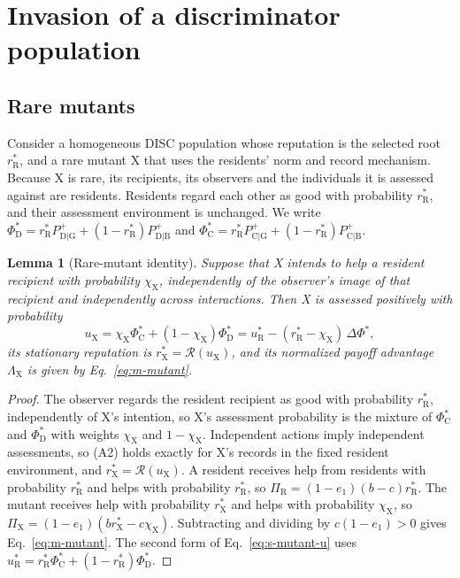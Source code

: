 \documentclass[fleqn,10pt]{wlscirep}
\newcommand{\Rmap}{\mathscr{R}}            %
\newcommand{\Pp}[1]{P^{+}_{\mathrm{#1}}}   %
\newcommand{\rR}{r_{\mathrm{R}}^{*}}
\newcommand{\uR}{u_{\mathrm{R}}^{*}}
\newcommand{\rX}{r_{\mathrm{X}}^{*}}
\newcommand{\uX}{u_{\mathrm{X}}}
\newcommand{\dPhi}{\Delta\Phi^{*}}
\theoremstyle{plain}
\newtheorem{lemma}{Lemma}
\begin{document}
\section{Invasion of a discriminator population}
\label{si:invasion}

\subsection{Rare mutants}
\label{si:mutant}

Consider a homogeneous DISC population whose reputation is the selected root $\rR$, and a rare mutant X that uses the residents' norm and record mechanism. Because X is rare, its recipients, its observers and the individuals it is assessed against are residents. Residents regard each other as good with probability $\rR$, and their assessment environment is unchanged. We write $\Phi^*_{\mathrm D}=\rR\Pp{D|G}+(1-\rR)\Pp{D|B}$ and $\Phi^*_{\mathrm C}=\rR\Pp{C|G}+(1-\rR)\Pp{C|B}$.

\begin{lemma}[Rare-mutant identity]\label{lem:mutant}
Suppose that X intends to help a resident recipient with probability $\chi_{\mathrm X}$, independently of the observer's image of that recipient and independently across interactions. Then X is assessed positively with probability
\begin{equation}
\uX=\chi_{\mathrm X}\Phi^*_{\mathrm C}+(1-\chi_{\mathrm X})\Phi^*_{\mathrm D}=\uR-(\rR-\chi_{\mathrm X})\,\dPhi,
\label{eq:s-mutant-u}
\end{equation}
its stationary reputation is $\rX=\Rmap(\uX)$, and its normalized payoff advantage $\Lambda_{\mathrm X}$ is given by Eq.~\eqref{eq:m-mutant}.
\end{lemma}
\begin{proof}
The observer regards the resident recipient as good with probability $\rR$, independently of X's intention, so X's assessment probability is the mixture of $\Phi^*_{\mathrm C}$ and $\Phi^*_{\mathrm D}$ with weights $\chi_{\mathrm X}$ and $1-\chi_{\mathrm X}$. Independent actions imply independent assessments, so (A2) holds exactly for X's records in the fixed resident environment, and $\rX=\Rmap(\uX)$. A resident receives help from residents with probability $\rR$ and helps with probability $\rR$, so $\Pi_{\mathrm R}=(1-e_1)(b-c)\rR$. The mutant receives help with probability $\rX$ and helps with probability $\chi_{\mathrm X}$, so $\Pi_{\mathrm X}=(1-e_1)(b\rX-c\chi_{\mathrm X})$. Subtracting and dividing by $c(1-e_1)>0$ gives Eq.~\eqref{eq:m-mutant}. The second form of Eq.~\eqref{eq:s-mutant-u} uses $\uR=\rR\Phi^*_{\mathrm C}+(1-\rR)\Phi^*_{\mathrm D}$.
\end{proof}
\end{document}
